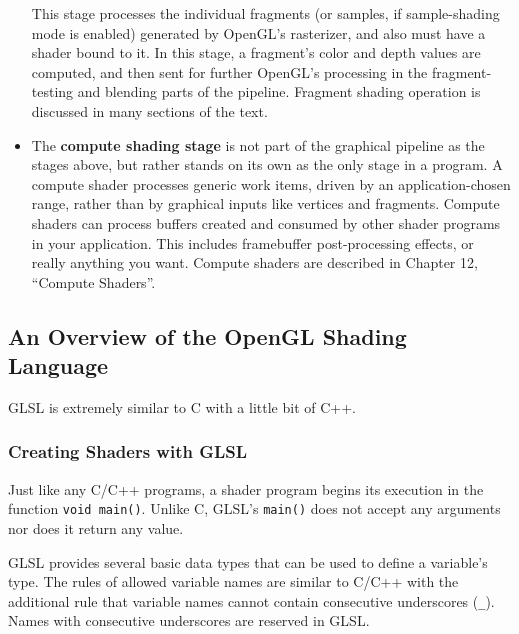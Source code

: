 \documentclass[a4paper, 12pt]{article}
\newcounter{subsubsubsection}[subsubsection]
\begin{document}
\begin{itemize}
            This stage processes the individual fragments (or samples, if sample-shading mode is enabled) generated by OpenGL's rasterizer, and also must have a shader bound to it.
            In this stage, a fragment's color and depth values are computed, and then sent for further OpenGL's processing in the fragment-testing and blending parts of the pipeline.
            Fragment shading operation is discussed in many sections of the text.
      \item
            The \textbf{compute shading stage} is not part of the graphical pipeline as the stages above, but rather stands on its own as the only stage in a program.
            A compute shader processes generic work items, driven by an application-chosen range, rather than by graphical inputs like vertices and fragments.
            Compute shaders can process buffers created and consumed by other shader programs in your application.
            This includes framebuffer post-processing effects, or really anything you want.
            Compute shaders are described in Chapter 12, ``Compute Shaders''.

\end{itemize}

\subsection{An Overview of the OpenGL Shading Language}

GLSL is extremely similar to C with a little bit of C++.

\subsubsection{Creating Shaders with GLSL}


Just like any C/C++ programs, a shader program begins its execution in the function \verb|void main()|.
Unlike C, GLSL's \verb|main()| does not accept any arguments nor does it return any value.


GLSL provides several basic data types that can be used to define a variable's type.
The rules of allowed variable names are similar to C/C++ with the additional rule that variable names cannot contain consecutive underscores (\verb|_|).
Names with consecutive underscores are reserved in GLSL.
\end{document}
